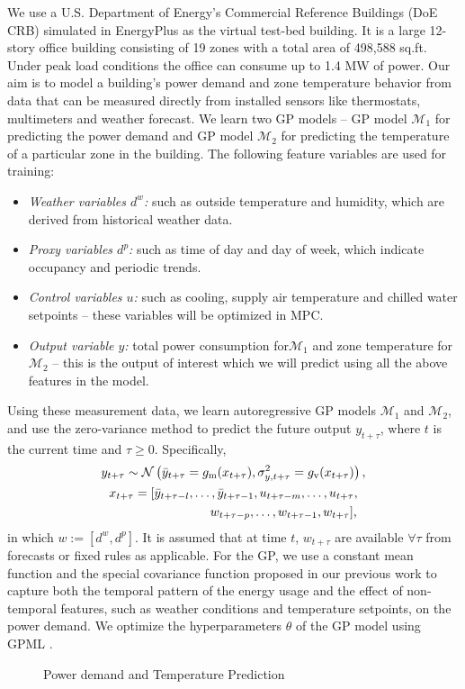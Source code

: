 We use a U.S. Department of Energy’s Commercial Reference Buildings (DoE CRB) simulated in EnergyPlus as the virtual test-bed building. It is a large 12-story office building consisting of 19 zones with a total area of 498,588 sq.ft. Under peak load conditions the office can consume up to 1.4 MW of power.
Our aim is to model a building's power demand and zone temperature behavior from data that can be measured directly from installed sensors like thermostats, multimeters and weather forecast.
We learn two GP models -- GP model \(\mathcal{M}_1\) for predicting the power demand and GP model \(\mathcal{M}_2\) for predicting the temperature of a particular zone in the building.
The following feature variables are used for training:
\begin{itemize}
\item \textit{Weather variables \(d^w\):} such as outside temperature and humidity, which are derived from historical weather data.
\item \textit{Proxy variables \(d^p\):} such as time of day and day of week, which indicate occupancy and periodic trends.
\item \textit{Control variables \(u\):} such as cooling, supply air temperature and chilled water setpoints -- these variables will be optimized in MPC.
\item \textit{Output variable \(y\):} total power consumption for\(\mathcal{M}_1\) and zone temperature for \(\mathcal{M}_2\) -- this is the output of interest which we will predict using all the above features in the model.
\end{itemize}

Using these measurement data, we learn autoregressive GP models \(\mathcal{M}_1\) and \(\mathcal{M}_2\), and use the zero-variance method to predict the future output \(y_{t+\tau}\), where $t$ is the current time and \( \tau \ge 0\).
Specifically,
\begin{gather}
\label{eq:dpc:prediction}
y_{t+\tau} \sim \operatorname*{\mathcal{N}}\left(\bar{y}_{t+\tau} = g_{\mathrm m}(x_{t+\tau}), \sigma^2_{y, t+\tau} = g_{\mathrm v}(x_{t+\tau})\right), \\
x_{t + \tau} = [\bar y_{t+ \tau-l}, \dots, \bar y_{t+ \tau-1}, u_{t+ \tau-m}, \dots, u_{t+ \tau}, \nonumber \\
\qquad\qquad\qquad\qquad  w_{t+ \tau-p}, \dots, w_{t+ \tau-1}, w_{t+ \tau}]\text, \nonumber
\end{gather}
in which \(w:=[d^w, d^p]\).
It is assumed that at time \(t\), \(w_{t+\tau}\) are available \(\forall \tau \) from forecasts or fixed rules as applicable.
For the GP, we use a constant mean function and the special covariance function proposed in our previous work \cite{nghiemetal16gp} to capture both the temporal pattern of the energy usage and the effect of non-temporal features, such as weather conditions and temperature setpoints, on the power demand.
We optimize the hyperparameters \(\theta\) %
of the GP model using GPML \cite{Rasmussen2010}.

\begin{figure}
	\caption{Power demand and Temperature Prediction}
	\label{F:prediction}
\end{figure}